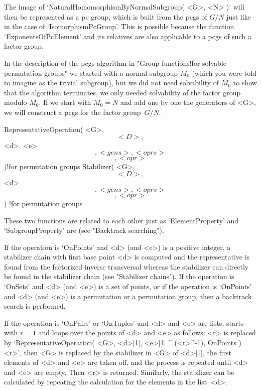The image of `NaturalHomomorphismByNormalSubgroup( <G>,  <N> )' will then
be represented as a pc group, which is built  from the pcgs of $G/N$ just
like  in the case of `IsomorphismPcGroup'.   This is possible because the
function `ExponentsOfPcElement' and its relatives  are also applicable to
a pcgs of such a factor group.

In the description of the pcgs algorithm in "Group functions!for solvable
permutation groups" we started  with a normal  subgroup $M_0$  (which you
were  told  to imagine  as the trivial   subgroup), but  we  did not need
solvability  of $M_0$  to  show that the   algorithm  terminates, we only
needed solvability  of the  factor group modulo  $M_0$.  If we start with
$M_0=N$ and add one by  one the generators of <G>,   we will construct  a
pcgs for the factor group~$G/N$.


\>RepresentativeOperation( <G>, \[ <D>, \] <d>, <e> \[, <gens>, <oprs> %
                           \] \[, <opr> \] )!{for permutation groups}
\>Stabilizer( <G>, \[ <D>, \] <d> \[, <gens>, <oprs> \] \[, <opr> \] )%
  !{for permutation groups}

These two  functions are related  to each other just as `ElementProperty'
and `SubgroupProperty' are (see "Backtrack searching").

If the operation is `OnPoints' and <d> (and <e>) is a positive integer, a
stabilizer   chain  with  first  base  point  <d>   is  computed  and the
representative is found  from the factorized inverse  transversal whereas
the stabilizer  can   directly be  found  in the   stabilizer chain  (see
"Stabilizer chains"). If the operation is `OnSets' and <d> (and <e>) is a
set of points, or if  the operation is `OnPoints' and  <d> (and <e>) is a
permutation or a permutation group, then a backtrack search is performed.

If the operation  is `OnPairs' or `OnTuples'  and <d> and  <e> are lists,
{\GAP} starts with  $r = 1$ and  loops over the points of  <d> and <e> as
follows: <r> is replaced by `RepresentativeOperation( <G>, <d>[1], <e>[1]
^ (<r>^-1), OnPoints ) \* <r>', then <G> is replaced by the stabilizer in
<G> of <d>[1], the first elements of <d>  and <e> are  taken off, and the
process  is repeated until <d>  and <e> are empty.  Then <r> is returned.
Similarly, the stabilizer can be  calculated by repeating the calculation
for the elements in the list~<d>.

